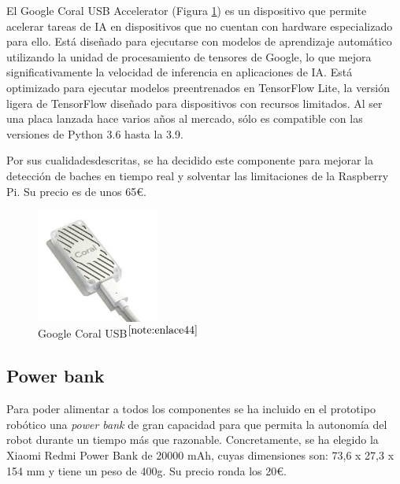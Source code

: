 El Google Coral USB Accelerator (Figura \ref{fig:googlecoral}) es un dispositivo que permite acelerar tareas de \ac{IA} en dispositivos que no cuentan con hardware especializado para ello. Está diseñado para ejecutarse con modelos de aprendizaje automático utilizando la unidad de procesamiento de tensores de Google, lo que mejora significativamente la velocidad de inferencia en aplicaciones de \acs{IA}. Está optimizado para ejecutar modelos preentrenados en TensorFlow Lite, la versión ligera de TensorFlow diseñado para dispositivos con recursos limitados. Al ser una placa lanzada hace varios años al mercado, sólo es compatible con  las versiones de Python 3.6 hasta la 3.9.

Por sus cualidadesdescritas, se ha decidido este componente para mejorar la detección de baches en tiempo real y solventar las limitaciones de la Raspberry Pi. Su precio es de unos 65€.
 
\begin{figure} [h!]
	\begin{center}
		\includegraphics[width=4cm]{figs/googlecoral.png}
	\end{center}
	\caption{Google Coral USB$^{\ref{note:enlace44}}$} 
	\label{fig:googlecoral}
\end{figure}

\setcounter{footnote}{44} %

\subsection{Power bank}

Para poder alimentar a todos los componentes se ha incluido en el prototipo robótico una \textit{power bank} de gran capacidad para que permita la autonomía del robot durante un tiempo más que razonable. Concretamente, se ha elegido la Xiaomi Redmi Power Bank de 20000 mAh, cuyas dimensiones son: 73,6 x 27,3 x 154 mm y tiene un peso de 400g. Su precio ronda los 20€.

